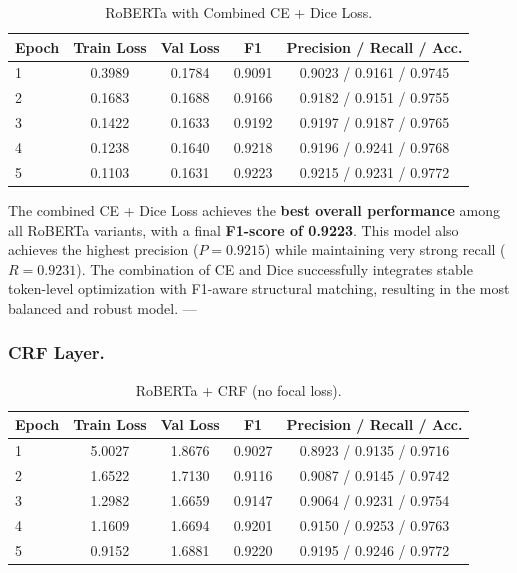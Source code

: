 \begin{table}[H]
\centering
\caption{RoBERTa with Combined CE + Dice Loss.}
\begin{tabular}{lcccc}
\hline
\textbf{Epoch} & \textbf{Train Loss} & \textbf{Val Loss} & \textbf{F1} & \textbf{Precision} / \textbf{Recall} / \textbf{Acc.} \\
\hline
1 & 0.3989 & 0.1784 & 0.9091 & 0.9023 / 0.9161 / 0.9745 \\
2 & 0.1683 & 0.1688 & 0.9166 & 0.9182 / 0.9151 / 0.9755 \\
3 & 0.1422 & 0.1633 & 0.9192 & 0.9197 / 0.9187 / 0.9765 \\
4 & 0.1238 & 0.1640 & 0.9218 & 0.9196 / 0.9241 / 0.9768 \\
5 & 0.1103 & 0.1631 & 0.9223 & 0.9215 / 0.9231 / 0.9772 \\
\hline
\end{tabular}
\label{tab:roberta_ce_dice}
\end{table}

The combined CE + Dice Loss achieves the \textbf{best overall performance} among all RoBERTa variants, with a final \textbf{F1-score of 0.9223}.
This model also achieves the highest precision ($P = 0.9215$) while maintaining very strong recall ($R = 0.9231$).
The combination of CE and Dice successfully integrates stable token-level optimization with F1-aware structural matching, resulting in the most balanced and robust model.
---

\subsubsection{CRF Layer.}

\begin{table}[H]
\centering
\caption{RoBERTa + CRF (no focal loss).}
\begin{tabular}{lcccc}
\hline
\textbf{Epoch} & \textbf{Train Loss} & \textbf{Val Loss} & \textbf{F1} & \textbf{Precision} / \textbf{Recall} / \textbf{Acc.} \\
\hline
1 & 5.0027 & 1.8676 & 0.9027 & 0.8923 / 0.9135 / 0.9716 \\
2 & 1.6522 & 1.7130 & 0.9116 & 0.9087 / 0.9145 / 0.9742 \\
3 & 1.2982 & 1.6659 & 0.9147 & 0.9064 / 0.9231 / 0.9754 \\
4 & 1.1609 & 1.6694 & 0.9201 & 0.9150 / 0.9253 / 0.9763 \\
5 & 0.9152 & 1.6881 & 0.9220 & 0.9195 / 0.9246 / 0.9772 \\
\hline
\end{tabular}
\label{tab:roberta_crf}
\end{table}

